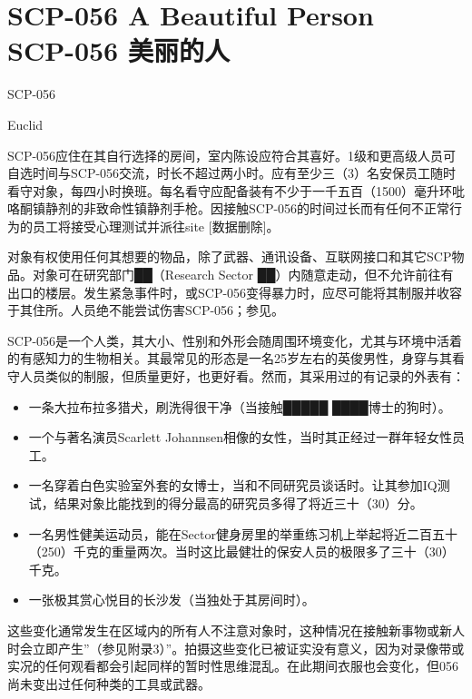 \chapter[SCP-056 美丽的人]{
    SCP-056 A Beautiful Person\\
    SCP-056 美丽的人
}

\label{chap:SCP-056}

SCP-056

Euclid

SCP-056应住在其自行选择的房间，室内陈设应符合其喜好。1级和更高级人员可自选时间与SCP-056交流，时长不超过两小时。应有至少三（3）名安保员工随时看守对象，每四小时换班。每名看守应配备装有不少于一千五百（1500）毫升环吡咯酮镇静剂的非致命性镇静剂手枪。因接触SCP-056的时间过长而有任何不正常行为的员工将接受心理测试并派往site {[}数据删除]。

对象有权使用任何其想要的物品，除了武器、通讯设备、互联网接口和其它SCP物品。对象可在研究部门██（Research Sector ██）内随意走动，但不允许前往有出口的楼层。发生紧急事件时，或SCP-056变得暴力时，应尽可能将其制服并收容于其住所。人员绝不能尝试伤害SCP-056；参见。

SCP-056是一个人类，其大小、性别和外形会随周围环境变化，尤其与环境中活着的有感知力的生物相关。其最常见的形态是一名25岁左右的英俊男性，身穿与其看守人员类似的制服，但质量更好，也更好看。然而，其采用过的有记录的外表有：

\begin{itemize}
\item 一条大拉布拉多猎犬，刷洗得很干净（当接触█████ ████博士的狗时）。
\item 一个与著名演员Scarlett Johannsen相像的女性，当时其正经过一群年轻女性员工。
\item 一名穿着白色实验室外套的女博士，当和不同研究员谈话时。让其参加IQ测试，结果对象比能找到的得分最高的研究员多得了将近三十（30）分。
\item 一名男性健美运动员，能在Sector健身房里的举重练习机上举起将近二百五十（250）千克的重量两次。当时这比最健壮的保安人员的极限多了三十（30）千克。
\item 一张极其赏心悦目的长沙发（当独处于其房间时）。
\end{itemize}

这些变化通常发生在区域内的所有人不注意对象时，这种情况在接触新事物或新人时会立即产生''（参见附录3）''。拍摄这些变化已被证实没有意义，因为对录像带或实况的任何观看都会引起同样的暂时性思维混乱。在此期间衣服也会变化，但056尚未变出过任何种类的工具或武器。

